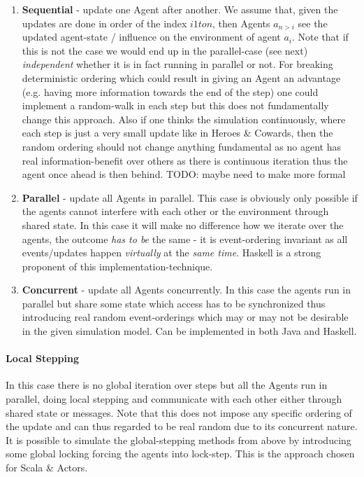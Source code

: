 \begin{enumerate}
\item \textbf{Sequential} - update one Agent after another. We assume that, given the updates are done in order of the index $i 1 to n$, then Agents $a_{n>i}$ see the updated agent-state / influence on the environment of agent $a_i$. Note that if this is not the case we would end up in the parallel-case (see next) \textit{independent} whether it is in fact running in parallel or not. For breaking deterministic ordering which could result in giving an Agent an advantage (e.g. having more information towards the end of the step) one could implement a random-walk in each step but this does not fundamentally change this approach. Also if one thinks the simulation continuously, where each step is just a very small update like in Heroes \& Cowards, then the random ordering should not change anything fundamental as no agent has real information-benefit over others as there is continuous iteration thus the agent once ahead is then behind. TODO: maybe need to make more formal

\item \textbf{Parallel} - update all Agents in parallel. This case is obviously only possible if the agents cannot interfere with each other or the environment through shared state. In this case it will make no difference how we iterate over the agents, the outcome \textit{has to be} the same - it is event-ordering invariant as all events/updates happen \textit{virtually} at the \textit{same time}. Haskell is a strong proponent of this implementation-technique.

\item \textbf{Concurrent} - update all Agents concurrently. In this case the agents run in parallel but share some state which access has to be synchronized thus introducing real random event-orderings which may or may not be desirable in the given simulation model. Can be implemented in both Java and Haskell.
\end{enumerate}

\paragraph{Local Stepping}
In this case there is no global iteration over steps but all the Agents run in parallel, doing local stepping and communicate with each other either through shared state or messages. Note that this does not impose any specific ordering of the update and can thus regarded to be real random due to its concurrent nature. It is possible to simulate the global-stepping methods from above by introducing some global locking forcing the agents into lock-step. This is the approach chosen for Scala \& Actors.

